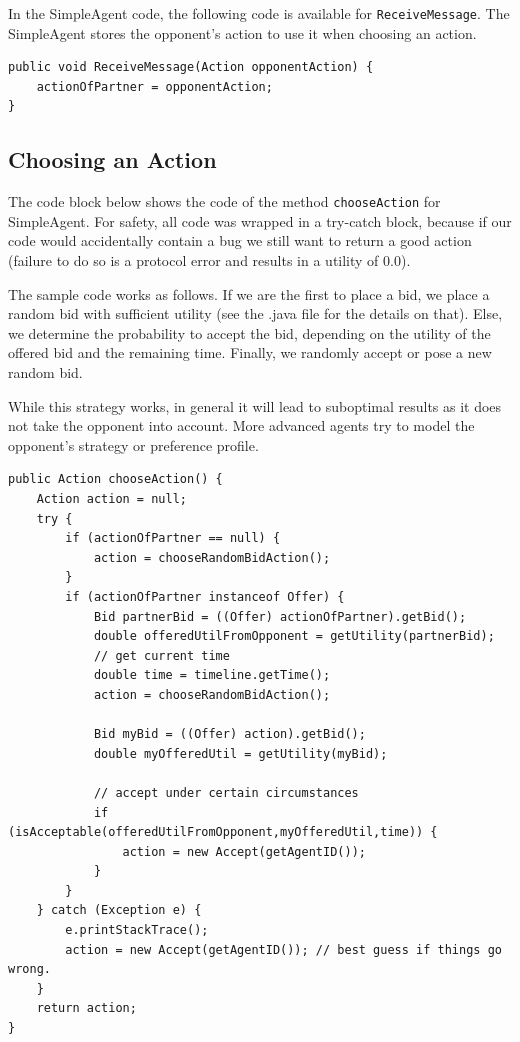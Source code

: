 \documentclass[]{article}
\begin{document}
In the SimpleAgent code, the following code is available for \texttt{ReceiveMessage}. The SimpleAgent stores the opponent's action to use it when choosing an action.

\begin{lstlisting}
public void ReceiveMessage(Action opponentAction) {
	actionOfPartner = opponentAction;
}
\end{lstlisting}

\subsection{Choosing an Action}
The code block below shows the code of the method \texttt{chooseAction} for SimpleAgent. For safety, all code was wrapped in a try-catch block, because if our code would accidentally contain a bug we still want to return a good action (failure to do so is a protocol error and results in a utility of 0.0).

The sample code works as follows. If we are the first to place a bid, we place a random bid with sufficient utility (see the .java file for the details on that). Else, we determine the probability to accept the bid, depending on the utility of the offered bid and the remaining time. Finally, we randomly accept or pose a new random bid.

While this strategy works, in general it will lead to suboptimal results as it does not take the opponent into account. More advanced agents try to model the opponent's strategy or preference profile.

\begin{lstlisting}
public Action chooseAction() {
	Action action = null;
	try { 
		if (actionOfPartner == null) {
			action = chooseRandomBidAction();
		}
		if (actionOfPartner instanceof Offer) {
			Bid partnerBid = ((Offer) actionOfPartner).getBid();
			double offeredUtilFromOpponent = getUtility(partnerBid);
			// get current time
			double time = timeline.getTime();
			action = chooseRandomBidAction();
			
			Bid myBid = ((Offer) action).getBid();
			double myOfferedUtil = getUtility(myBid);
			
			// accept under certain circumstances
			if (isAcceptable(offeredUtilFromOpponent,myOfferedUtil,time)) {
				action = new Accept(getAgentID());
			}
		}
	} catch (Exception e) { 
		e.printStackTrace();
		action = new Accept(getAgentID()); // best guess if things go wrong. 
	}
	return action;
}
\end{lstlisting}
\end{document}
